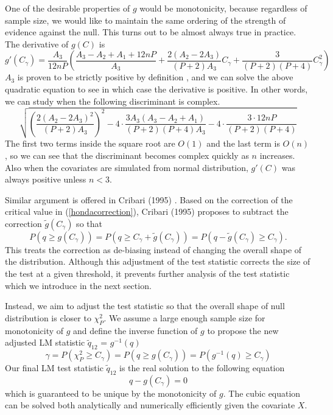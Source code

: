 \documentclass[12pt]{article}
\theoremstyle{theorem}
\begin{document}
\vspace{5mm} \noindent 
One of the desirable properties of $g$ would be monotonicity, because regardless of sample size, we would like to maintain the same ordering of the strength of evidence against the null. This turns out to be almost always true in practice. The derivative of $g(C)$ is 
$$g'(C_{\gamma}) = \frac{A_3}{12nP}\left( \frac{A_3-A_2+A_1+12nP}{A_3} + 
 \frac{2(A_2-2A_3)}{(P+2)A_3}C_{\gamma} + \frac{3}{(P+2)(P+4)}C_{\gamma}^2
\right)$$
$A_3$ is proven to be strictly positive by definition \cite{cribari1995improved}, and we can solve the above quadratic equation to see in which case the derivative is positive. In other words, we can study when the following discriminant is complex.
$$\sqrt{
\left(\frac{2(A_2-2A_3)^2}{(P+2)A_3}\right)^2 - 4\cdot\frac{3A_3(A_3-A_2+A_1)}{(P+2)(P+4)A_3} - 4\cdot
\frac{3 \cdot 12nP}{(P+2)(P+4)}
}$$
The first two terms inside the square root are $O(1)$ and the last term is $O(n)$, so we can see that the discriminant becomes complex quickly as $n$ increases. Also when the covariates are simulated from normal distribution, $g'(C)$ was always positive unless $n<3$. 

\vspace{5mm} \noindent
Similar argument is offered in Cribari (1995) \cite{cribari1995improved}. Based on the correction of the critical value in (\ref{hondacorrection}), Cribari (1995) proposes to subtract the correction $\tilde{g}(C_{\gamma})$ so that
$$P(q  \geq g(C_{\gamma})) = P(q \geq C_{\gamma} + \tilde{g}(C_{\gamma})) = P(q - \tilde{g}(C_{\gamma}) \geq C_{\gamma}).$$
This treats the correction as de-biasing instead of changing the overall shape of the distribution. Although this adjustment of the test statistic corrects the size of the test at a given threshold, it prevents further analysis of the test statistic which we introduce in the next section. 

\vspace{5mm} \noindent
Instead, we aim to adjust the test statistic so that the overall shape of null distribution is closer to $\chi_{P}^2$. We assume a large enough sample size for monotonicity of $g$ and define the inverse function of $g$ to propose the new adjusted LM statistic $\tilde{q}_{12}$ = $g^{-1}(q)$
$$\gamma = P(\chi_{P}^2 \geq C_{\gamma}) = P(q \geq g(C_{\gamma})) = P(g^{-1}(q) \geq C_{\gamma})$$
Our final LM test statistic $\tilde{q}_{12}$ is the real solution to the following equation 
$$q - g(C_{\gamma}) = 0$$
which is guaranteed to be unique by the monotonicity of $g$. The cubic equation can be solved both analytically and numerically efficiently given the covariate $X$. 
\end{document}
